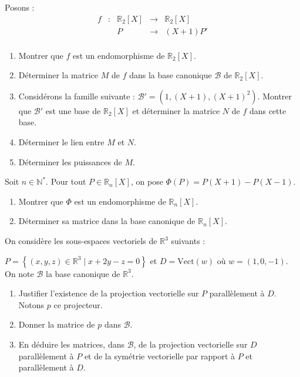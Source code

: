 \documentclass[a4paper,twoside,french,10pt]{VcCours}
\begin{document}
\begin{Exercice}{}\end{Exercice} Posons :
$$ \begin{array}{ccccl}
f & : & \mathbb{R}_2[X] & \rightarrow & \mathbb{R}_2[X] \\
& & P & \rightarrow & (X+1)P' \\
\end{array} $$
\begin{enumerate}
\item Montrer que $f$ est un endomorphisme de $ \mathbb{R}_2[X]$.
\item Déterminer la matrice $M$ de $f$ dans la base canonique $\mathcal{B}$ de $\mathbb{R}_2[X]$.
\item Considérons la famille suivante : $\mathcal{B}'= (1, (X+1),(X+1)^2)$. Montrer que $\mathcal{B}'$ est une base de $\mathbb{R}_2[X]$ et déterminer la matrice $N$ de $f$ dans cette base.
\item Déterminer le lien entre $M$ et $N$.
\item Déterminer les puissances de $M$.
\end{enumerate}





\medskip

\begin{Exercice}{}\end{Exercice}  Soit $n \in \mathbb{N}^*$. Pour tout $P \in \mathbb{R}_n[X]$, on pose $\Phi(P)=P(X+1)-P(X-1)$.

\begin{enumerate}
\item Montrer que $\Phi$ est un endomorphisme de $\mathbb{R}_n[X]$.
\item Déterminer sa matrice dans la base canonique de $\mathbb{R}_n[X]$.
\end{enumerate}

\medskip

\begin{Exercice}{}\end{Exercice}
On considère les sous-espaces vectoriels de $\mathbb{R}^3 $ suivants :

$P = \left\{ {(x,y,z) \in \mathbb{R}^3 \mid x + 2y - z = 0} \right\}$ et $D = \textrm{Vect} (w){\text{ o\`u }}w = (1,0, - 1)$. On note $\mathcal{B}$ la base canonique de $\mathbb{R}^3 $.

\begin{enumerate}
\item Justifier l'existence de la projection vectorielle sur $P$ parallèlement à $D$. Notons $p$ ce projecteur.
\item Donner la matrice de $p$ dans ${\mathcal{B}}$.
\item En déduire les matrices, dans ${\mathcal{B}}$, de la projection vectorielle sur $D$ parallèlement à $P$ et de la symétrie vectorielle par rapport à $P$ et parallèlement à $D$.
\end{enumerate}
\end{document}
